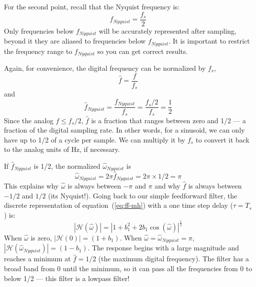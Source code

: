 For the second point, recall that the Nyquist frequency is:
\begin{equation}
f_\mathit{Nyquist}=\frac{f_s}{2}
\end{equation}
Only frequencies below $f_\mathit{Nyquist}$ will be accurately
represented after sampling, beyond it they are aliased to frequencies
below $f_\mathit{Nyquist}$. It is important to restrict the frequency
range to $f_\mathit{Nyquist}$ so you can get correct results.

Again, for convenience, the digital frequency can be normalized by
$f_s$,
\begin{equation}
\hat{f} = \frac{f}{f_s}
\end{equation}
and 
\begin{equation}
\hat{f}_\mathit{Nyquist}=\frac{f_\mathit{Nyquist}}{f_s}=\frac{f_s/2}{f_s}=\frac{1}{2}
\end{equation}
Since the analog $f \leq f_s/2$, $\hat{f}$ is a fraction that ranges
between zero and 1/2 --- a fraction of the digital sampling rate. In
other words, for a sinusoid, we can only have up to 1/2 of a cycle per
sample. We can multiply it by $f_s$ to convert it back to the analog
units of Hz, if necessary.

If $\hat{f}_\mathit{Nyquist}$ is 1/2, the normalized
$\hat{\omega}_\mathit{Nyquist}$ is
\begin{equation}
\hat{\omega}_\mathit{Nyquist} = 2\pi \hat{f}_\mathit{Nyquist}= 2\pi \times 1/2 = \pi 
\end{equation}
%
This explains why $\hat{\omega}$ is always between $-\pi$ and $\pi$ and why $\hat{f}$ is always between $-1/2$ and $1/2$ (its Nyquist!). Going back to our simple feedforward filter, the discrete
representation of equation~(\ref{eq:ff-mh}) with a one time step delay
($\tau = T_s$) is:
\begin{equation}
|\mathcal{H}(\hat{\omega})|=|1+b_1^2 + 2b_1
\cos(\hat{\omega})|^\frac{1}{2}
\end{equation}
When $\hat{\omega}$ is zero, $|\mathcal{H}(0)|=(1+b_1)$. When $\hat{\omega}=\hat{\omega}_\mathit{Nyquist}=\pi$,
$|\mathcal{H}(\hat{\omega}_\mathit{Nyquist})|=(1-b_1)$. The response begins with a large magnitude and reaches a minimum at $\hat{f}=1/2$ (the maximum digital frequency).
The filter has a broad band from 0 until the minimum, so it can pass all
the frequencies from 0 to below 1/2 --- this filter is a lowpass
filter!

